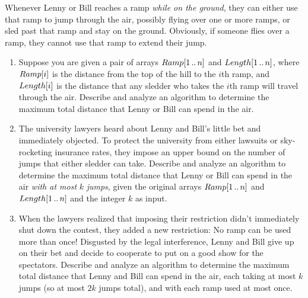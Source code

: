 \begin{enumerate}[label=\arabic*.,ref=\thechapter.\arabic*,leftmargin=*,align=left,widest*=99,itemsep=1.5ex plus 0.5ex]
Whenever Lenny or Bill reaches a ramp \textit{while on the ground}, they can either use that ramp to jump through the air, possibly flying over one or more ramps, or sled past that ramp and stay on the ground.
Obviously, if someone flies over a ramp, they cannot use that ramp to extend their jump.
\begin{enumerate}
\item Suppose you are given a pair of arrays $Ramp[1\,..\,n]$ and $Length[1\,..\,n]$, where $Ramp[i]$ is the distance from the top of the hill to the $i$th ramp, and $Length[i]$ is the distance that any sledder who takes the $i$th ramp will travel through the air.
Describe and analyze an algorithm to determine the maximum total distance that Lenny or Bill can spend in the air.
\item The university lawyers heard about Lenny and Bill’s little bet and immediately objected.
To protect the university from either lawsuits or sky-rocketing insurance rates, they impose an upper bound on the number of jumps that either sledder can take.
Describe and analyze an algorithm to determine the maximum total distance that Lenny or Bill can spend in the air \textit{with at most} $k$ \textit{jumps}, given the original arrays $Ramp[1\,..\,n]$ and $Length[1\,..\,n]$ and the integer $k$ as input.
\item {} When the lawyers realized that imposing their restriction didn’t immediately shut down the contest, they added a new restriction: No ramp can be used more than once!
Disgusted by the legal interference, Lenny and Bill give up on their bet and decide to cooperate to put on a good show for the spectators.
Describe and analyze an algorithm to determine the maximum total distance that Lenny and Bill can spend in the air, each taking at most $k$ jumps (so at most $2k$ jumps total), and with each ramp used at most once.
\end{enumerate}


\end{enumerate}
